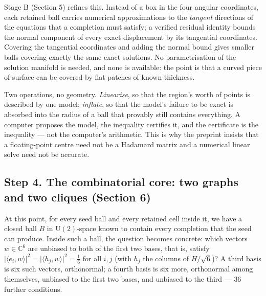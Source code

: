\documentclass[11pt]{article}
\theoremstyle{definition}
\theoremstyle{plain}
\theoremstyle{definition}
\newcommand{\C}{\mathbb{C}}
\newcommand{\U}{\mathrm{U}}
\newcommand{\inner}[2]{\langle #1,#2\rangle}
\newcommand{\abs}[1]{\lvert #1\rvert}
\begin{document}
Stage B (Section 5) refines this. Instead of a box in the four angular coordinates, each retained
ball carries numerical approximations to the \emph{tangent} directions of the equations that a
completion must satisfy; a verified residual identity bounds the normal component of every exact
displacement by its tangential coordinates. Covering the tangential coordinates and adding the normal
bound gives smaller balls covering exactly the same exact solutions. No parametrisation of the
solution manifold is needed, and none is available: the point is that a curved piece of surface can
be covered by flat patches of known thickness.

\begin{ideabox}
Two operations, no geometry. \emph{Linearise}, so that the region's worth of points is described by
one model; \emph{inflate}, so that the model's failure to be exact is absorbed into the radius of a
ball that provably still contains everything. A computer proposes the model, the inequality certifies
it, and the certificate is the inequality --- not the computer's arithmetic. This is why the preprint
insists that a floating-point centre need not be a Hadamard matrix and a numerical linear solve need
not be accurate.
\end{ideabox}

\subsection*{Step 4. The combinatorial core: two graphs and two cliques (Section 6)}

At this point, for every seed ball and every retained cell inside it, we have a closed ball $B$ in
$\U(2)$-space known to contain every completion that the seed can produce. Inside such a ball, the
question becomes concrete: which vectors $w\in\C^6$ are unbiased to both of the first two bases,
that is, satisfy $\abs{\inner{e_i}{w}}^2=\abs{\inner{h_j}{w}}^2=\tfrac16$ for all $i,j$ (with $h_j$
the columns of $H/\sqrt6$)? A third basis is six such vectors, orthonormal; a fourth basis is six
more, orthonormal among themselves, unbiased to the first two bases, and unbiased to the third ---
$36$ further conditions.
\end{document}
